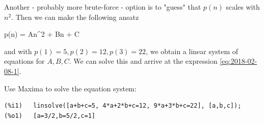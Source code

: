 Another - probably more brute-force - option is to "guess" that $p(n)$ scales with $n^2$. Then we can make the following ansatz

\bee
p(n) = An^2 + Bn + C
\eee

and with $p(1) = 5, p(2) = 12, p(3) = 22$, we obtain a linear system of equations for $A,B,C$. We can solve this and arrive at the expression \eqref{eq:2018-02-08-1}.


Use Maxima to solve the equation system:


\begin{verbatim}
(%i1)	linsolve([a+b+c=5, 4*a+2*b+c=12, 9*a+3*b+c=22], [a,b,c]);
(%o1)	[a=3/2,b=5/2,c=1]
\end{verbatim}


